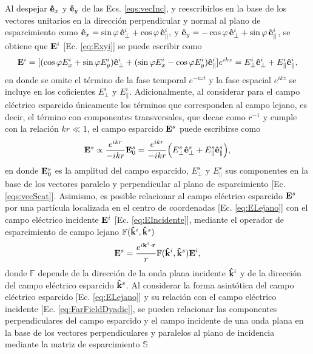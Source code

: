 \noindent Al despejar $\vu{e}_x$ y $\vu{e}_y$  de las Ecs. \eqref{eqs:vecInc}, y reescribirlos en la base de los vectores unitarios en la dirección perpendicular y normal al plano de esparcimiento como $\vu{e}_x = \sin\varphi\,\vu{e}_{\perp}^i + \cos\varphi\,\vu{e}_{\parallel}^i, $ y $\vu{e}_y = - \cos\varphi \,\vu{e}_{\perp}^i + \sin\varphi\,\vu{e}_{\parallel}^i$, se obtiene que $\vb{E}^i$ [Ec. \eqref{eq:Exyi}] se puede escribir como
\begin{align}
\vb{E}^i = [(\cos\varphi E_{x}^i + \sin\varphi E_{y}^i)\vu{e}_{\perp}^i +
			 (\sin\varphi E_{x}^i - \cos\varphi E_{y}^i)\vu{e}_{\parallel}^i]
			 e^{ikz}
			 = E_{\perp}^i  \vu{e}_{\perp}^i + E_{\parallel}^i\vu{e}_{\parallel}^i,
		\label{eq:EIncidente}
\end{align}
en donde se omite el término de la fase temporal $e^{-i\omega t}$ y la fase espacial $e^{ikz}$ se incluye en los coficientes $E_\perp^i$ y $E_\parallel^i$. Adicionalmente, al considerar para el campo eléctrico esparcido  únicamente los términos que corresponden al campo lejano, es decir, el término con componentes transversales, que decae como $r^{-1}$ y cumple con la relación $kr\ll 1$, el campo esparcido $\vb{E}^s$ puede escribirse como \cite{bohren1998absorption} \vspace*{-1em}
	\begin{align}
	\vb{E}^s \propto \frac{e^{ikr}}{-ikr}\vb{E}_0^s 
			=  \frac{e^{ikr}}{-ikr}
			\qty( E_{\perp}^s  \vu{e}_{\perp}^s + E_{\parallel}^s \vu{e}_{\parallel}^s), \label{eq:ELejano}
	\end{align}
en donde  $\vb{E}_0^s$ es la amplitud del campo esparcido,  $ E_{\perp}^s$ y  $ E_{\parallel}^s$ sus componentes en la base de los vectores paralelo y perpendicular al plano de esparcimiento [Ec. \eqref{eqs:vecScat}]. Asimismo, es posible relacionar al campo eléctrico esparcido $\vb{E}^s$ por una partícula localizada en el centro de coordenadas  [Ec. \eqref{eq:ELejano}] con el  campo eléctrico incidente $\vb{E}^i$ [Ec. \eqref{eq:EIncidente}],  mediante el operador de esparcimiento de campo lejano  $\mathbb{F}(\vu{k}^i,\vu{k}^s)$  \cite{tsang2000scattering}
	\begin{align}
	\vb{E}^s = \frac{e^{i\vb{k}^s\cdot\vb{r}}}{r}\mathbb{F}(\vu{k}^i,\vu{k}^s)\vb{E}^i,
	\label{eq:FarFieldDyadic}
	\end{align}
donde $\mathbb{F}$ depende de la dirección de la onda plana incidente $\vu{k}^i$ y de la dirección del campo eléctrico esparcido $\vu{k}^s$. Al considerar la forma asintótica del campo eléctrico esparcido [Ec. \eqref{eq:ELejano}] y su relación con el campo eléctrico incidente [Ec. \eqref{eq:FarFieldDyadic}], se pueden relacionar las componentes perpendiculares del campo esparcido y el campo incidente de una onda plana en la base de los vectores perpendiculares y paralelos al plano de incidencia mediante la matriz de esparcimiento $\mathbb{S}$  \cite{bohren1998absorption} \vspace*{-1em}
